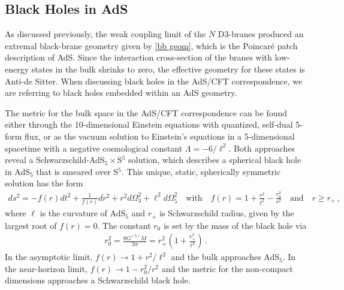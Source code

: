 \documentclass[../PhD.tex]{subfiles}
\begin{document}

\subsection{Black Holes in AdS}
\label{sub: bh in ads}

As discussed previously, the weak coupling limit of the $N$ D3-branes produced an extremal black-brane geometry given by \eqref{bb geom}, which is the Poincar\'e patch description of AdS. Since the interaction cross-section of the branes with low-energy states in the bulk shrinks to zero, the effective geometry for these states is Anti-de Sitter. When discussing black holes in the AdS/CFT correspondence, we are referring to black holes embedded within an AdS geometry. 

The metric for the bulk space in the AdS/CFT correspondence can be found either through the 10-dimensional Einstein equations with quantized, self-dual 5-form flux, or as the vacuum solution to Einstein's equations in a 5-dimensional spacetime with a negative cosmological constant $\Lambda = -6/\ell^2$. Both approaches reveal a Schwarzschild-AdS$_5 \times$S$^5$ solution, which describes a spherical black hole in AdS$_5$ that is smeared over S$^5$. This unique, static, spherically symmetric solution has the form
\begin{align}
\label{AdS5xS5 bh}
ds^2 = -f(r) dt^2 + \frac{1}{f(r)} dr^2 + r^2 d\Omega^2_3 + \ell^2 d\Omega_5^2 \quad \text{with} \quad f(r) = 1 + \frac{r^2}{\ell^2} - \frac{r_0^2}{r^2} \quad \text{and} \quad r \geq r_+ \, ,
\end{align}
where $\ell$ is the curvature of AdS$_5$ and $r_+$ is Schwarzschild radius, given by the largest root of $f(r)= 0$. The constant $r_0$ is set by the mass of the black hole via
\begin{align}
r_0^2 = \frac{8 G^{(5)} M}{3\pi} = r_+^2 \left( 1 + \frac{r_+^2}{\ell^2} \right) \, .
\end{align}
In the asymptotic limit, $f(r) \to 1 + r^2 / \ell^2$ and the bulk approaches AdS$_5$. In the near-horizon limit, $f(r) \to 1 - r_0^2/r^2$ and the metric for the non-compact dimensions approaches a Schwarzschild black hole.
\end{document}
